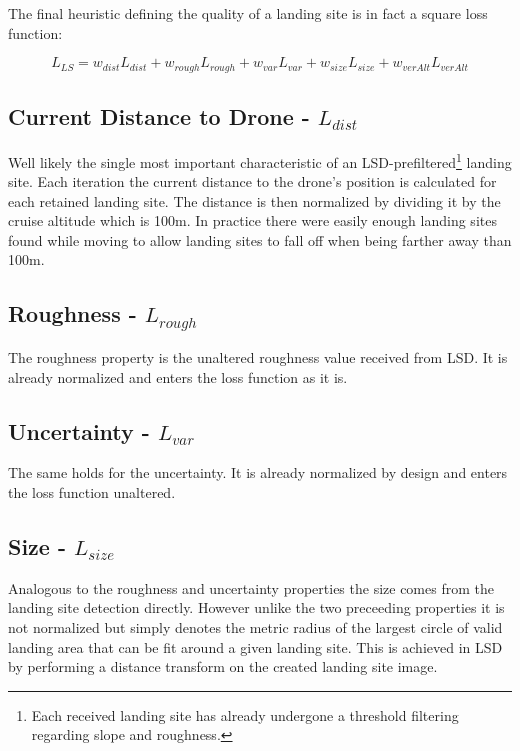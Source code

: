 The final heuristic defining the quality of a landing site is in fact a square loss function:

\begin{equation}
    L_{LS} = w_{dist}L_{dist} + w_{rough}L_{rough} + w_{var}L_{var} + w_{size}L_{size} + w_{verAlt}L_{verAlt}
    \label{eq:loss_fct}
\end{equation}

\subsection{Current Distance to Drone - $L_{dist}$}
Well likely the single most important characteristic of an LSD-prefiltered\footnote[1]{Each received landing site has already undergone a threshold filtering regarding slope and roughness.} landing site. Each iteration the current distance to the drone's position is calculated for each retained landing site. The distance is then normalized by dividing it by the cruise altitude which is 100m. In practice there were easily enough landing sites found while moving to allow landing sites to fall off when being farther away than 100m.

\subsection{Roughness - $L_{rough}$}

The roughness property is the unaltered roughness value received from LSD. It is already normalized and enters the loss function as it is. 

\subsection{Uncertainty - $L_{var}$}

The same holds for the uncertainty. It is already normalized by design and enters the loss function unaltered.

\subsection{Size - $L_{size}$}

Analogous to the roughness and uncertainty properties the size comes from the landing site detection directly. However unlike the two preceeding properties it is not normalized but simply denotes the metric radius of the largest circle of valid landing area that can be fit around a given landing site. This is achieved in LSD by performing a distance transform on the created landing site image.

